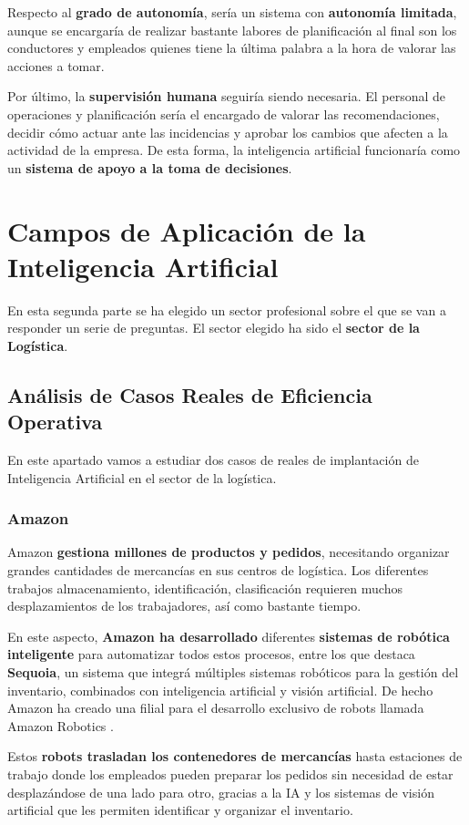 Respecto al \textbf{grado de autonomía}, sería un sistema con \textbf{autonomía limitada}, aunque se encargaría de realizar bastante labores de planificación al final son los conductores y empleados quienes tiene la última palabra a la hora de valorar las acciones a tomar.

Por último, la \textbf{supervisión humana} seguiría siendo necesaria. El personal de operaciones y planificación sería el encargado de valorar las recomendaciones, decidir cómo actuar ante las incidencias y aprobar los cambios que afecten a la actividad de la empresa. De esta forma, la inteligencia artificial funcionaría como un \textbf{sistema de apoyo a la toma de decisiones}.

\section{Campos de Aplicación de la Inteligencia Artificial}
En esta segunda parte se ha elegido un sector profesional sobre el que se van a responder un serie de preguntas. El sector elegido ha sido el \textbf{sector de la Logística}.

\subsection{Análisis de Casos Reales de Eficiencia Operativa}
En este apartado vamos a estudiar dos casos de reales de implantación de Inteligencia Artificial en el sector de la logística.

\subsubsection{Amazon}
Amazon \textbf{gestiona millones de productos y pedidos}, necesitando organizar grandes cantidades de mercancías en sus centros de logística. Los diferentes trabajos almacenamiento, identificación, clasificación requieren muchos desplazamientos de los trabajadores, así como bastante tiempo.

En este aspecto, \textbf{Amazon ha desarrollado} diferentes \textbf{sistemas de robótica inteligente} para automatizar todos estos procesos, entre los que destaca \textbf{Sequoia}, un sistema que integrá múltiples sistemas robóticos para la gestión del inventario, combinados con inteligencia artificial y visión artificial. De hecho Amazon ha creado una filial para el desarrollo exclusivo de robots llamada Amazon Robotics \cite{amz01}. 

Estos \textbf{robots trasladan los contenedores de mercancías} hasta estaciones de trabajo donde los empleados pueden preparar los pedidos sin necesidad de estar desplazándose de una lado para otro, gracias a la IA y los sistemas de visión artificial que les permiten identificar y organizar el inventario.

